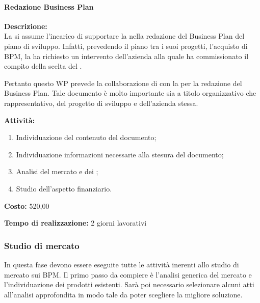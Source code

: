 \paragraph{Redazione Business Plan}
\begin{description}
\item{\bfseries Descrizione:}\\
La \team si assume l'incarico di supportare la \customer nella redazione  del Business Plan del piano di sviluppo. Infatti, prevedendo il piano tra i suoi progetti, l'acquisto di \sw BPM, la \customer ha richiesto un intervento dell'azienda alla quale ha commissionato il compito della scelta del \sw.

Pertanto questo WP prevede la collaborazione di \team con la \customer per la redazione del Business Plan. Tale documento è molto importante sia a titolo organizzativo che rappresentativo, del progetto di sviluppo e dell'azienda stessa.
  \item  {\bfseries Attività:}
  \begin{enumerate}
		\item Individuazione del contenuto del documento;
		\item Individuazione informazioni necessarie alla stesura del documento;
		\item Analisi del mercato e dei ;
		\item Studio dell'aspetto finanziario.
	\end{enumerate}
  \item{\bfseries Costo:} \text{\euro} 520,00 
  \item{\bfseries Tempo di realizzazione:} 2 giorni lavorativi
\end{description}

\subsubsection{Studio di mercato}
In questa fase devono essere eseguite tutte le attività inerenti allo studio di mercato sui \sw BPM\@.
Il primo passo da compiere è l'analisi generica del mercato e l'individuazione dei prodotti esistenti. Sarà poi necessario selezionare alcuni \sw atti all'analisi approfondita in modo tale da poter scegliere la migliore soluzione. 


